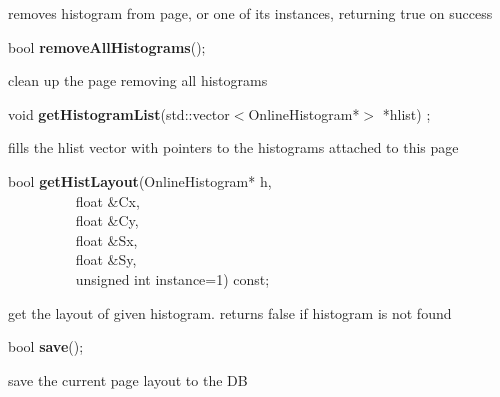  removes histogram from page, or one of its instances, returning true on success


\item    bool {\bf removeAllHistograms}();


 clean up the page removing all histograms


\item    void {\bf getHistogramList}(std::vector$<$OnlineHistogram*$>$ *hlist) ;

 fills the hlist vector with pointers to the histograms attached to this page


\item    bool {\bf getHistLayout}(OnlineHistogram* h,\\\mbox{}~~~~~~~~~
		     float \&Cx,\\\mbox{}~~~~~~~~~
		     float \&Cy,\\\mbox{}~~~~~~~~~
		     float \&Sx,\\\mbox{}~~~~~~~~~
		     float \&Sy,\\\mbox{}~~~~~~~~~
		     unsigned int instance=1) const;

 get the layout of given histogram. returns false if histogram is not found


\item    bool {\bf save}();


 save the current page layout to the DB


